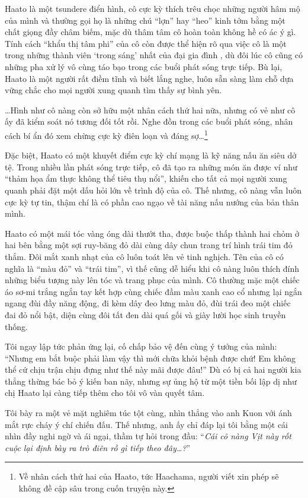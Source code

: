 \documentclass[../main.tex]{subfiles}
\begin{document}
Haato là một tsundere điển hình, cô cực kỳ thích trêu chọc những người hâm mộ của mình và thường gọi họ là những chú ``lợn'' hay ``heo'' kinh tởm bằng một chất giọng đầy châm biếm, mặc dù thâm tâm cô hoàn toàn không hề có ác ý gì. Tính cách ``khẩu thị tâm phi'' của cô còn được thể hiện rõ qua việc cô là một trong những thành viên `trong sáng' nhất của đại gia đình \hll, dù đôi lúc cô cũng có những pha xử lý vô cùng táo bạo trong các buổi phát sóng trực tiếp. Bù lại, Haato là một người rất điềm tĩnh và biết lắng nghe, luôn sẵn sàng làm chỗ dựa vững chắc cho mọi người xung quanh tìm thấy sự bình yên.

\dots Hình như cô nàng còn sở hữu một nhân cách thứ hai nữa, nhưng có vẻ như cô ấy đã kiểm soát nó tương đối tốt rồi. Nghe đồn trong các buổi phát sóng, nhân cách bí ẩn đó xem chừng cực kỳ điên loạn và đáng sợ\dots\footnote{Về nhân cách thứ hai của Haato, tức Haachama, người viết xin phép sẽ không đề cập sâu trong cuốn truyện này.}

Đặc biệt, Haato có một khuyết điểm cực kỳ chí mạng là kỹ năng nấu ăn siêu dở tệ. Trong nhiều lần phát sóng trực tiếp, cô đã tạo ra những món ăn được ví như ``thảm họa ẩm thực không thể tiêu thụ nổi'', khiến cho tất cả mọi người xung quanh phải đặt một dấu hỏi lớn về trình độ của cô. Thế nhưng, cô nàng vẫn luôn cực kỳ tự tin, thậm chí là có phần cao ngạo về tài năng nấu nướng của bản thân mình.

Haato có một mái tóc vàng óng dài thướt tha, được buộc thấp thành hai chỏm ở hai bên bằng một sợi ruy-băng đỏ dài cùng dây chun trang trí hình trái tim đỏ thắm. Đôi mắt xanh nhạt của cô luôn toát lên vẻ tinh nghịch. Tên của cô có nghĩa là ``màu đỏ'' và ``trái tim'', vì thế cũng dễ hiểu khi cô nàng luôn thích đính những biểu tượng này lên tóc và trang phục của mình. Cô thường mặc một chiếc áo sơ-mi trắng ngắn tay kết hợp cùng chiếc đầm màu xanh cao cổ nhưng lại ngắn ngang đùi đầy năng động, đi kèm dây đeo lưng màu đỏ, đùi trái đeo một chiếc đai đỏ nổi bật, diện cùng đôi tất đen dài quá gối và giày lười học sinh truyền thống.

\chrint

Tôi ngay lập tức phản ứng lại, cố chấp bảo vệ đến cùng ý tưởng của mình: ``Nhưng em bắt buộc phải làm vậy thì mới chữa khỏi bệnh được chứ! Em không thể cứ chịu trận chịu đựng như thế này mãi được đâu!'' Dù có bị cả hai người kia thẳng thừng bác bỏ ý kiến ban nãy, nhưng sự ủng hộ từ một tiền bối lập dị như chị Haato lại càng tiếp thêm cho tôi vô vàn quyết tâm.

Tôi bày ra một vẻ mặt nghiêm túc tột cùng, nhìn thẳng vào anh Kuon với ánh mắt rực cháy ý chí chiến đấu. Thế nhưng, anh ấy chỉ đáp lại tôi bằng một cái nhìn đầy nghi ngờ và ái ngại, thầm tự hỏi trong đầu: ``\textit{Cái cô nàng Vịt này rốt cuộc lại định bày ra trò điên rồ gì tiếp theo đây\dots?}''
\end{document}
